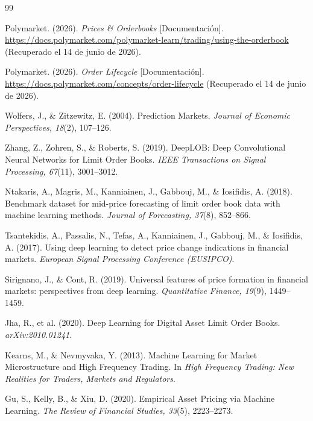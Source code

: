 \begin{thebibliography}{99}

Polymarket. (2026). \textit{Prices \& Orderbooks} [Documentación].
\url{https://docs.polymarket.com/polymarket-learn/trading/using-the-orderbook}
(Recuperado el 14 de junio de 2026).

Polymarket. (2026). \textit{Order Lifecycle} [Documentación].
\url{https://docs.polymarket.com/concepts/order-lifecycle}
(Recuperado el 14 de junio de 2026).

Wolfers, J., \& Zitzewitz, E. (2004). Prediction Markets.
\textit{Journal of Economic Perspectives, 18}(2), 107--126.

Zhang, Z., Zohren, S., \& Roberts, S. (2019). DeepLOB: Deep Convolutional Neural
Networks for Limit Order Books. \textit{IEEE Transactions on Signal Processing,
67}(11), 3001--3012.

Ntakaris, A., Magris, M., Kanniainen, J., Gabbouj, M., \& Iosifidis, A. (2018).
Benchmark dataset for mid-price forecasting of limit order book data with machine
learning methods. \textit{Journal of Forecasting, 37}(8), 852--866.

Tsantekidis, A., Passalis, N., Tefas, A., Kanniainen, J., Gabbouj, M., \& Iosifidis, A.
(2017). Using deep learning to detect price change indications in financial markets.
\textit{European Signal Processing Conference (EUSIPCO)}.

Sirignano, J., \& Cont, R. (2019). Universal features of price formation in financial
markets: perspectives from deep learning. \textit{Quantitative Finance, 19}(9), 1449--1459.

Jha, R., et al. (2020). Deep Learning for Digital Asset Limit Order Books.
\textit{arXiv:2010.01241}.

Kearns, M., \& Nevmyvaka, Y. (2013). Machine Learning for Market Microstructure and
High Frequency Trading. In \textit{High Frequency Trading: New Realities for Traders,
Markets and Regulators}.

Gu, S., Kelly, B., \& Xiu, D. (2020). Empirical Asset Pricing via Machine Learning.
\textit{The Review of Financial Studies, 33}(5), 2223--2273.


\end{thebibliography}
